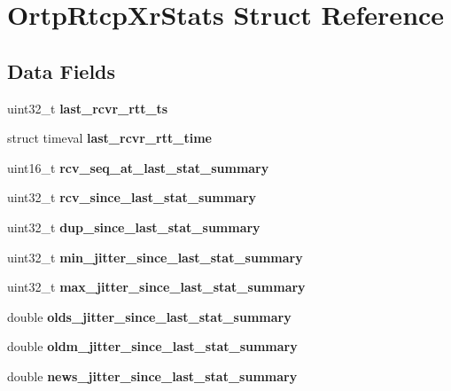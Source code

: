 \section{Ortp\+Rtcp\+Xr\+Stats Struct Reference}
\label{structOrtpRtcpXrStats}
\subsection*{Data Fields}
\begin{DoxyCompactItemize}
\item 
\mbox{\label{structOrtpRtcpXrStats_a90119203aa6fccd537e9305894002eb0}} 
uint32\+\_\+t {\bfseries last\+\_\+rcvr\+\_\+rtt\+\_\+ts}
\item 
\mbox{\label{structOrtpRtcpXrStats_a2695e74c7fc708308e7d0ebb7dfac4fb}} 
struct timeval {\bfseries last\+\_\+rcvr\+\_\+rtt\+\_\+time}
\item 
\mbox{\label{structOrtpRtcpXrStats_a310e94277d8f6880ae3edc54f38ff806}} 
uint16\+\_\+t {\bfseries rcv\+\_\+seq\+\_\+at\+\_\+last\+\_\+stat\+\_\+summary}
\item 
\mbox{\label{structOrtpRtcpXrStats_a50cf2fa083e6dc92567ef892df2d72d4}} 
uint32\+\_\+t {\bfseries rcv\+\_\+since\+\_\+last\+\_\+stat\+\_\+summary}
\item 
\mbox{\label{structOrtpRtcpXrStats_ab59edf6aa050b21cf2d43004315c13a5}} 
uint32\+\_\+t {\bfseries dup\+\_\+since\+\_\+last\+\_\+stat\+\_\+summary}
\item 
\mbox{\label{structOrtpRtcpXrStats_a239cbf57f1780a946f42c0173a750466}} 
uint32\+\_\+t {\bfseries min\+\_\+jitter\+\_\+since\+\_\+last\+\_\+stat\+\_\+summary}
\item 
\mbox{\label{structOrtpRtcpXrStats_a5889f3b441d2baf7504e99b978956999}} 
uint32\+\_\+t {\bfseries max\+\_\+jitter\+\_\+since\+\_\+last\+\_\+stat\+\_\+summary}
\item 
\mbox{\label{structOrtpRtcpXrStats_aafe974593e452a25088f5e73ed02eea2}} 
double {\bfseries olds\+\_\+jitter\+\_\+since\+\_\+last\+\_\+stat\+\_\+summary}
\item 
\mbox{\label{structOrtpRtcpXrStats_af294e86f8dd1c0e3e747a2362948f943}} 
double {\bfseries oldm\+\_\+jitter\+\_\+since\+\_\+last\+\_\+stat\+\_\+summary}
\item 
\mbox{\label{structOrtpRtcpXrStats_ac28accbd153f20e5809d733b9cf47e4d}} 
double {\bfseries news\+\_\+jitter\+\_\+since\+\_\+last\+\_\+stat\+\_\+summary}
\item 
\mbox{\label{structOrtpRtcpXrStats_a6e9af710553a9f6779d64334843bd911}} 

\end{DoxyCompactItemize}
